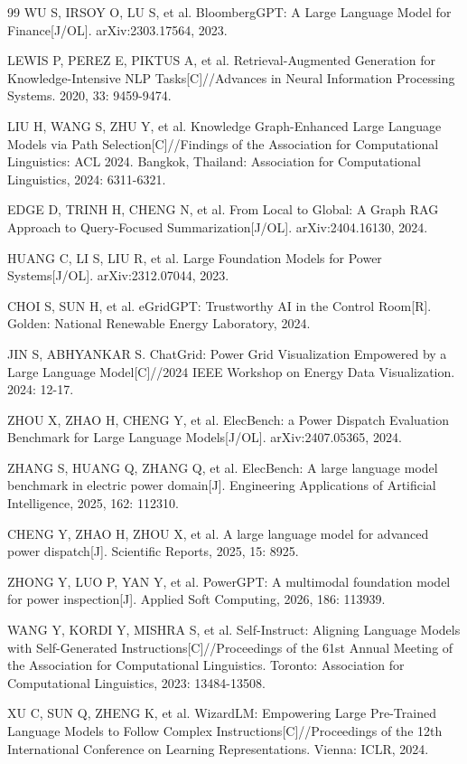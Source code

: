 \documentclass[fontset=fandol,type=master,campus=shenzhen,etitleauto=true]{hithesisbook}
\begin{document}
\begin{thebibliography}{99}
 WU S, IRSOY O, LU S, et al. BloombergGPT: A Large Language Model for Finance[J/OL]. arXiv:2303.17564, 2023.

 LEWIS P, PEREZ E, PIKTUS A, et al. Retrieval-Augmented Generation for Knowledge-Intensive NLP Tasks[C]//Advances in Neural Information Processing Systems. 2020, 33: 9459-9474.

 LIU H, WANG S, ZHU Y, et al. Knowledge Graph-Enhanced Large Language Models via Path Selection[C]//Findings of the Association for Computational Linguistics: ACL 2024. Bangkok, Thailand: Association for Computational Linguistics, 2024: 6311-6321.

 EDGE D, TRINH H, CHENG N, et al. From Local to Global: A Graph RAG Approach to Query-Focused Summarization[J/OL]. arXiv:2404.16130, 2024.

 HUANG C, LI S, LIU R, et al. Large Foundation Models for Power Systems[J/OL]. arXiv:2312.07044, 2023.

 CHOI S, SUN H, et al. eGridGPT: Trustworthy AI in the Control Room[R]. Golden: National Renewable Energy Laboratory, 2024.

 JIN S, ABHYANKAR S. ChatGrid: Power Grid Visualization Empowered by a Large Language Model[C]//2024 IEEE Workshop on Energy Data Visualization. 2024: 12-17.

 ZHOU X, ZHAO H, CHENG Y, et al. ElecBench: a Power Dispatch Evaluation Benchmark for Large Language Models[J/OL]. arXiv:2407.05365, 2024.

 ZHANG S, HUANG Q, ZHANG Q, et al. ElecBench: A large language model benchmark in electric power domain[J]. Engineering Applications of Artificial Intelligence, 2025, 162: 112310.

 CHENG Y, ZHAO H, ZHOU X, et al. A large language model for advanced power dispatch[J]. Scientific Reports, 2025, 15: 8925.

 ZHONG Y, LUO P, YAN Y, et al. PowerGPT: A multimodal foundation model for power inspection[J]. Applied Soft Computing, 2026, 186: 113939.

 WANG Y, KORDI Y, MISHRA S, et al. Self-Instruct: Aligning Language Models with Self-Generated Instructions[C]//Proceedings of the 61st Annual Meeting of the Association for Computational Linguistics. Toronto: Association for Computational Linguistics, 2023: 13484-13508.

 XU C, SUN Q, ZHENG K, et al. WizardLM: Empowering Large Pre-Trained Language Models to Follow Complex Instructions[C]//Proceedings of the 12th International Conference on Learning Representations. Vienna: ICLR, 2024.


\end{thebibliography}
\end{document}

